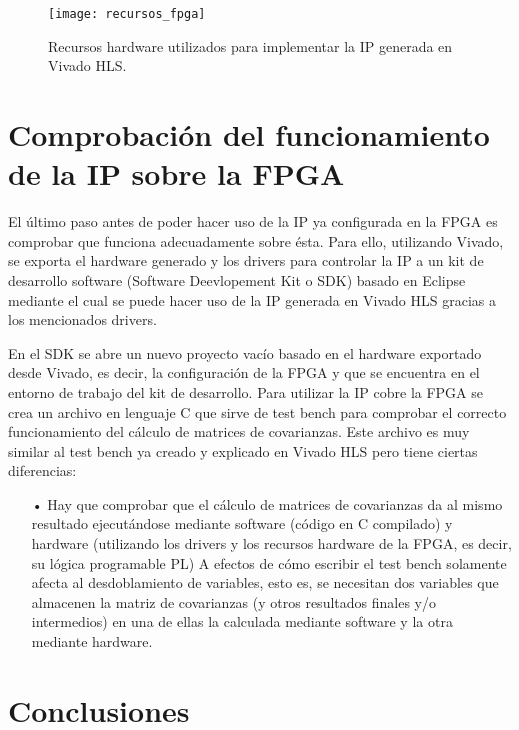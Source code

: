 \begin{figure}
\centering
\texttt{[image: recursos\_fpga]}
\caption{Recursos hardware utilizados para implementar la IP generada en Vivado HLS.}\label{fig:recursos_fpga}
\end{figure}

\section{Comprobación del funcionamiento de la IP sobre la FPGA}
El último paso antes de poder hacer uso de la IP ya configurada en la FPGA es comprobar que funciona adecuadamente sobre ésta. Para ello, utilizando Vivado, se exporta el hardware generado y los drivers para controlar la IP a un kit de desarrollo software (Software Deevlopement Kit o SDK) basado en Eclipse mediante el cual se puede hacer uso de la IP generada en Vivado HLS gracias a los mencionados drivers. 

En el SDK se abre un nuevo proyecto vacío basado en el hardware exportado desde Vivado, es decir, la configuración de la FPGA y que se encuentra en el entorno de trabajo del kit de desarrollo. Para utilizar la IP cobre la FPGA se crea un archivo en lenguaje C que sirve de test bench para comprobar el correcto funcionamiento del cálculo de matrices de covarianzas. Este archivo es muy similar al test bench ya creado y explicado en Vivado HLS pero tiene ciertas diferencias:

\begin{itemize}
\item[•] Hay que comprobar que el cálculo de matrices de covarianzas da al mismo resultado ejecutándose mediante software (código en C compilado) y hardware (utilizando los drivers y los recursos hardware de la FPGA, es decir, su lógica programable PL) A efectos de cómo escribir el test bench solamente afecta al desdoblamiento de variables, esto es, se necesitan dos variables que almacenen la matriz de covarianzas (y otros resultados finales y/o intermedios) en una de ellas la calculada mediante software y la otra mediante hardware.
\end{itemize} 


\section{Conclusiones}


